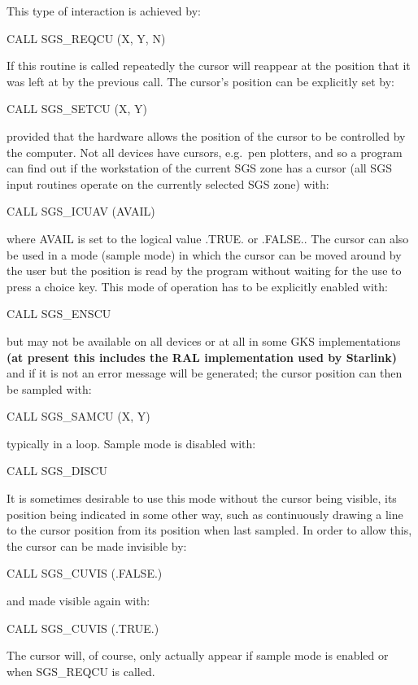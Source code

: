 \documentclass[11pt]{starlink}
\begin{document}
This type of interaction is achieved by:
\begin{terminalv}
CALL SGS_REQCU (X, Y, N)
\end{terminalv}
If
this routine is called repeatedly the cursor will reappear at the position
that it was left at by the previous call.  The
cursor's position can be explicitly
set by:
\begin{terminalv}
CALL SGS_SETCU (X, Y)
\end{terminalv}
provided that the hardware allows the position of the cursor to be controlled
by the computer.  Not all devices have cursors, e.g.\ pen plotters, and so a
program can find out if the workstation
of the current SGS zone has a cursor (all SGS
input routines operate on the currently selected SGS
zone) with:
\begin{terminalv}
CALL SGS_ICUAV (AVAIL)
\end{terminalv}
where AVAIL is set to the logical value .TRUE.
or .FALSE..  The cursor can also
be used in a mode (sample mode) in which the cursor can be moved around by the
user but the position is read by the program without waiting for the use to
press a choice key.  This mode of operation has to be explicitly enabled with:
\begin{terminalv}
CALL SGS_ENSCU
\end{terminalv}
but may not be available on all devices or at all in some GKS
implementations \textbf{(at present this
includes the RAL implementation used by Starlink)} and if it is not
an error message will be generated;  the cursor position can
then be sampled with:
\begin{terminalv}
CALL SGS_SAMCU (X, Y)
\end{terminalv}
typically in a loop.  Sample mode is disabled with:
\begin{terminalv}
CALL SGS_DISCU
\end{terminalv}
It is sometimes desirable to use this mode without the cursor being visible,
its position being indicated in some other way, such as continuously drawing a
line to the cursor position from its position when last
sampled.  In order to
allow this, the cursor can be made invisible by:
\begin{terminalv}
CALL SGS_CUVIS (.FALSE.)
\end{terminalv}
and made visible again with:
\begin{terminalv}
CALL SGS_CUVIS (.TRUE.)
\end{terminalv}
The cursor will, of course,
only actually appear if sample mode is enabled or
when SGS\_REQCU is called.
\end{document}
